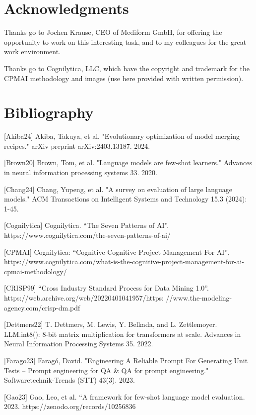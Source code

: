 \documentclass[twocolumn]{article}
\begin{document}
\section{Acknowledgments}

Thanks go to Jochen Krause, CEO of Mediform GmbH, for offering the opportunity to work on this interesting task, and to my colleagues for the great work environment.

Thanks go to Cognilytica, LLC, which have the copyright and trademark for the CPMAI methodology and images (use here provided with written permission).


\section{Bibliography}

\hspace{3ex}[Akiba24] Akiba, Takuya, et al. "Evolutionary optimization of model merging recipes." arXiv preprint arXiv:2403.13187. 2024.

[Brown20] Brown, Tom, et al. "Language models are few-shot learners." Advances in neural information processing systems 33. 2020.

[Chang24] Chang, Yupeng, et al. "A survey on evaluation of large language models." ACM Transactions on Intelligent Systems and Technology 15.3 (2024): 1-45.

[Cognilytica] Cognilytica. “The Seven Patterns of AI”. https://www.cognilytica.com/the-seven-patterns-of-ai/

[CPMAI] Cognilytica: “Cognitive Cognitive Project Management For AI”, https://www.cognilytica.com/what-is-the-cognitive-project-management-for-ai-cpmai-methodology/

[CRISP99] “Cross Industry Standard Process for Data Mining 1.0”. https://web.archive.org/web/20220401041957/https:
//www.the-modeling-agency.com/crisp-dm.pdf

[Dettmers22] T. Dettmers, M. Lewis, Y. Belkada, and L. Zettlemoyer. LLM.int8(): 8-bit matrix multiplication for transformers at scale. Advances in Neural Information Processing Systems 35. 2022.

[Farago23] Faragó, David. "Engineering A Reliable Prompt For Generating Unit Tests -- Prompt engineering for QA \& QA for prompt engineering." Softwaretechnik-Trends (STT) 43(3). 2023.

[Gao23] Gao, Leo, et al. “A framework for few-shot language model evaluation. 2023. https://zenodo.org/records/10256836
\end{document}
